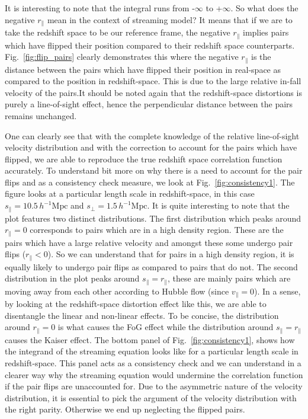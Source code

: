 \documentclass[a4paper,fleqn,usenatbib]{mnras}
\begin{document}
	It is interesting to note that the integral runs from -$\infty$ to +$\infty$. So what does the negative $r_{\parallel}$ mean in the context of streaming model? It means that if we are to take the redshift space to be our reference frame, the negative $r_{\parallel}$ implies pairs which have flipped their position compared to their redshift space counterparts. Fig.~\ref{fig:flip_pairs} clearly demonstrates this where the negative $r_{\parallel}$ is the distance between the pairs which have flipped their position in real-space as compared to the position in redshift-space. This is due to the large relative in-fall velocity of the pairs.It should be noted again that the redshift-space distortions is purely a line-of-sight effect, hence the perpendicular distance between the pairs remains unchanged.
	
	 One can clearly see that with the complete knowledge of the relative line-of-sight velocity distribution and with the correction to account for the pairs which have flipped, we are able to reproduce the true redshift space correlation function accurately. To understand bit more on why there is a need to account for the pair flips and as a consistency check measure, we look at Fig.~\ref{fig:consistency1}. The figure looks at a particular length scale in redshift-space, in this case $s_{\parallel} = 10.5 \,h^{-1}\mathrm{Mpc}$ and $s_{\perp} = 1.5\,h^{-1}\mathrm{Mpc}$. It is quite interesting to note that the plot features two distinct distributions. The first distribution which peaks around $r_{\parallel} = 0$ corresponds to pairs which are in a high density region. These are the pairs which have a large relative velocity and amongst these some undergo pair flips ($r_{\parallel} < 0$). So we can understand that for pairs in a high density region, it is equally likely to undergo pair flips as compared to pairs that do not. The second distribution in the plot peaks around $s_{\parallel} = r_{\parallel}$, these are mainly pairs which are moving away from each other according to Hubble flow (since $v_{\parallel}=0$). In a sense, by looking at the redshift-space distortion effect like this, we are able to disentangle the linear and non-linear effects. To be concise, the distribution around $r_{\parallel} = 0$ is what causes the FoG effect while the distribution around $s_{\parallel} = r_{\parallel}$ causes the Kaiser effect. The bottom panel of Fig.~\ref{fig:consistency1}, shows how the integrand of the streaming equation looks like for a particular length scale in redshift-space. This panel acts as a consistency check and we can understand in a clearer way why the streaming equation would undermine the correlation function if the pair flips are unaccounted for. Due to the asymmetric nature of the velocity distribution, it is essential to pick the argument of the velocity distribution with the right parity. Otherwise we end up neglecting the flipped pairs.
	 
\end{document}
